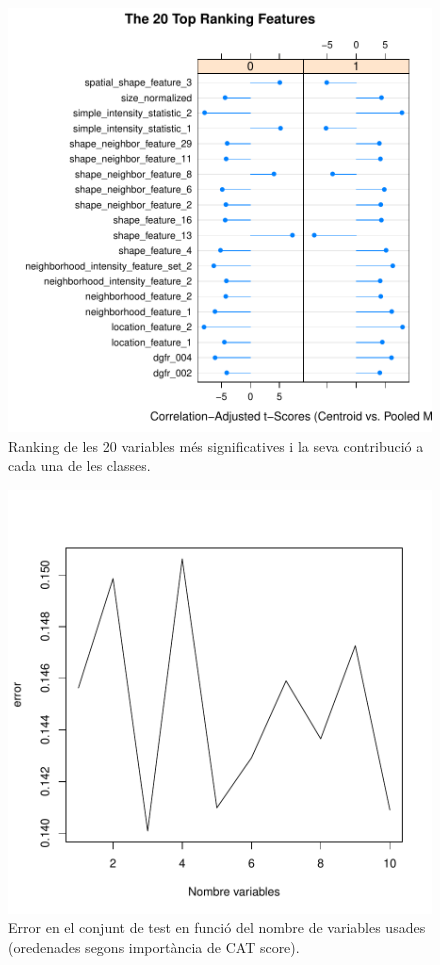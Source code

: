 \documentclass[a4paper,10pt]{article}
\begin{document}
\begin{center}
\begin{figure}
\includegraphics[width=5in]{memoria-top_var_da}
\caption{Ranking de les 20 variables més significatives i la seva contribució a cada una de les classes.} \label{fig:top_var_da}
\end{figure}
\end{center}

\begin{center}
\begin{figure}
\includegraphics[width=5in]{memoria-lda_var_selec}
\caption{Error en el conjunt de test en funció del nombre de variables usades (oredenades segons importància de CAT score).} \label{fig:lda_var_selec}
\end{figure}
\end{center}
\end{document}
